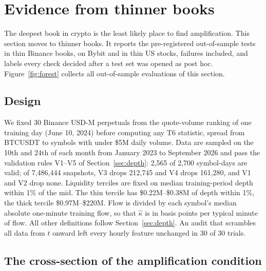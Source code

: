 \documentclass[12pt]{article}
\theoremstyle{definition}
\theoremstyle{remark}
\begin{document}
\section{Evidence from thinner books}\label{sec:thin}

The deepest book in crypto is the least likely place to find amplification. This section moves to thinner books. It reports the pre-registered out-of-sample tests in thin Binance books, on Bybit and in thin US stocks, failures included, and labels every check decided after a test set was opened as post hoc. Figure~\ref{fig:forest} collects all out-of-sample evaluations of this section.

\subsection{Design}\label{sec:thin_design}
We fixed 30 Binance USD-M perpetuals from the quote-volume ranking of one training day (June 10, 2024) before computing any T6 statistic, spread from BTCUSDT to symbols with under \$5M daily volume. Data are sampled on the 10th and 24th of each month from January 2023 to September 2026 and pass the validation rules V1--V5 of Section~\ref{sec:depth}: 2{,}565 of 2{,}700 symbol-days are valid; of 7{,}486{,}444 snapshots, V3 drops 212{,}745 and V4 drops 161{,}280, and V1 and V2 drop none. Liquidity terciles are fixed on median training-period depth within 1\% of the mid. The thin tercile has \$0.22M--\$0.38M of depth within 1\%, the thick tercile \$0.97M--\$220M. Flow is divided by each symbol's median absolute one-minute training flow, so that $\hat\kappa$ is in basis points per typical minute of flow. All other definitions follow Section~\ref{sec:depth}. An audit that scrambles all data from $t$ onward left every hourly feature unchanged in 30 of 30 trials.

\subsection{The cross-section of the amplification condition}
\end{document}
